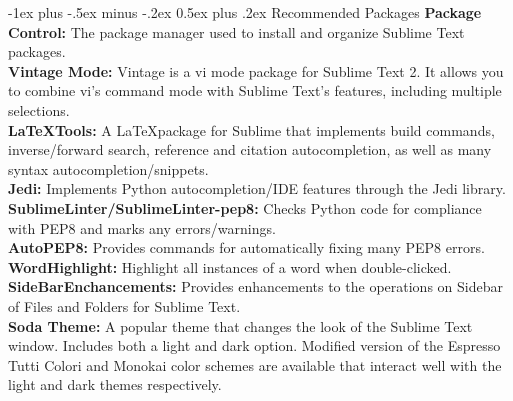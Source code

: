 \documentclass[10pt,landscape]{article}
\makeatletter
\newcommand{\nl}{\\[.3ex]}
\newcommand{\hid}{\hangindent=0.3cm}
\renewcommand{\section}{\@startsection{section}{1}{0mm}%
                                {-1ex plus -.5ex minus -.2ex}%
                                {0.5ex plus .2ex}%
                                {\normalfont\large\bfseries}}
\makeatother
\begin{document}
\begin{multicols*}{3}
\section{Recommended Packages}
\hid
{\bf Package Control:} The package manager used to 
install and organize Sublime Text packages. \nl
\hid
{\bf Vintage Mode:} Vintage is a vi mode package for Sublime Text 2. It allows 
you to combine vi's command mode with Sublime Text's features, including multiple selections.\nl
\hid
{\bf LaTeXTools:} A \LaTeX package for Sublime that implements build commands, 
inverse/forward search, reference and citation autocompletion, as well as many syntax 
autocompletion/snippets.\nl
\hid
{\bf Jedi:} 
Implements Python autocompletion/IDE features through the Jedi library. 
\nl
\hid
{\bf SublimeLinter/SublimeLinter-pep8:} 
Checks Python code for compliance with PEP8 and marks any errors/warnings. 
\nl
\hid
{\bf AutoPEP8:} 
Provides commands for automatically fixing many PEP8 errors. 
\nl
\hid
{\bf WordHighlight:} 
Highlight all instances of a word when double-clicked. 
\nl
\hid
{\bf SideBarEnchancements:} 
Provides enhancements to the operations on Sidebar of Files and Folders for Sublime Text.
\nl
\hid
{\bf Soda Theme:} 
A popular theme that changes the look of the Sublime Text window. Includes both a light and 
dark option. Modified version of the Espresso Tutti Colori and 
Monokai color schemes are available that interact well with the 
light and dark themes respectively. 
\nl


\end{multicols*}
\end{document}
